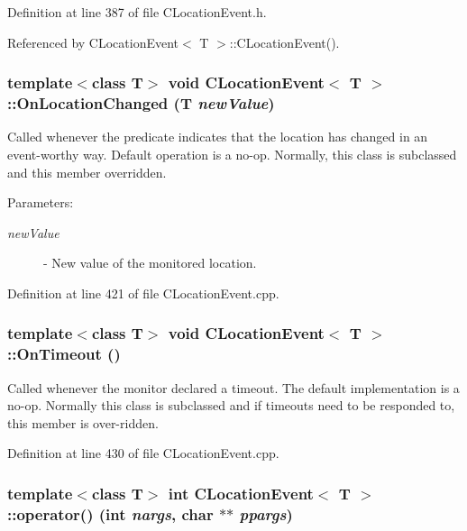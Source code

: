 Definition at line 387 of file CLocation\-Event.h.

Referenced by CLocation\-Event$<$ T $>$::CLocation\-Event().
\subsubsection{\setlength{\rightskip}{0pt plus 5cm}template$<$class T$>$ void CLocation\-Event$<$ T $>$::On\-Location\-Changed (T {\em new\-Value})\hspace{0.3cm}{\tt  [virtual]}}\label{classCLocationEvent_a8}


Called whenever the predicate indicates that the location has changed in an event-worthy way. Default operation is a no-op. Normally, this class is subclassed and this member overridden.\begin{Desc}
\item[Parameters: ]\par
\begin{description}
\item[{\em 
new\-Value}]- New value of the monitored location. \end{description}
\end{Desc}


Definition at line 421 of file CLocation\-Event.cpp.
\subsubsection{\setlength{\rightskip}{0pt plus 5cm}template$<$class T$>$ void CLocation\-Event$<$ T $>$::On\-Timeout ()\hspace{0.3cm}{\tt  [virtual]}}\label{classCLocationEvent_a9}


Called whenever the monitor declared a timeout. The default implementation is a no-op. Normally this class is subclassed and if timeouts need to be responded to, this member is over-ridden. 

Definition at line 430 of file CLocation\-Event.cpp.
\subsubsection{\setlength{\rightskip}{0pt plus 5cm}template$<$class T$>$ int CLocation\-Event$<$ T $>$::operator() (int {\em nargs}, char $\ast$$\ast$ {\em ppargs})\hspace{0.3cm}{\tt  [protected, virtual]}}\label{classCLocationEvent_b0}


